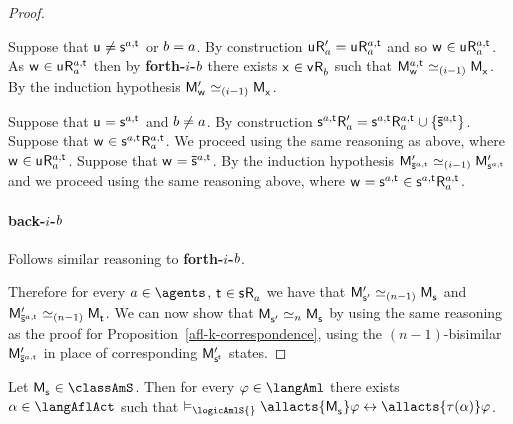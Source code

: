 \begin{proof}
\begin{enumerate}
        Suppose that $\aStateU \neq \aStateS[\agentA,\aStateT]$ or $b = a$.
        By construction $\aStateU \aAccessibilityP{\agentA} = \aStateU \aAccessibility[\agentA,\aStateT]{\agentA}$ and so $\aStateW \in \aStateU \aAccessibility[\agentA,\aStateT]{\agentA}$. 
        As $\aStateW \in \aStateU \aAccessibility[\agentA,\aStateT]{\agentA}$ then by {\bf forth-$i$-$b$} there exists $\aStateX \in \aStateV \aAccessibility{\agentB}$ such that $\aPModel[\agentA,\aStateT]{\aStateW} \bisimilar[(i - 1)] \aPModel{\aStateX}$.
        By the induction hypothesis $\aPModelP{\aStateW} \bisimilar[(i - 1)] \aPModel{\aStateX}$.

        Suppose that $\aStateU = \aStateS[\agentA,\aStateT]$ and $b \neq a$. 
        By construction $\aStateS[\agentA,\aStateT] \aAccessibilityP{\agentA} = \aStateS[\agentA,\aStateT] \aAccessibility[\agentA,\aStateT]{\agentA} \cup \{\aPStateS[\agentA,\aStateT]\}$. 
        Suppose that $\aStateW \in \aStateS[\agentA,\aStateT] \aAccessibility[\agentA,\aStateT]{\agentA}$. 
        We proceed using the same reasoning as above, where $\aStateW \in \aStateU \aAccessibility[\agentA,\aStateT]{\agentA}$. 
        Suppose that $\aStateW = \aPStateS[\agentA,\aStateT]$.
        By the induction hypothesis $\aPModelP{\aPStateS[\agentA,\aStateT]} \bisimilar[(i - 1)] \aPModelP{\aStateS[\agentA,\aStateT]}$ and we proceed using the same reasoning above, where $\aStateW = \aStateS[\agentA,\aStateT] \in \aStateS[\agentA,\aStateT] \aAccessibility[\agentA,\aStateT]{\agentA}$.

        \paragraph{back-$i$-$b$} Follows similar reasoning to {\bf forth-$i$-$b$}.
\end{enumerate}

Therefore for every $\agentA \in \agents$, $\aStateT \in \aStateS \aAccessibility{\agentA}$ we have that $\aPModelP{\aStateSP} \bisimilar[(n - 1)] \aPModel{\aStateS}$ and $\aPModelP{\aPStateS[\agentA,\aStateT]} \bisimilar[(n - 1)] \aPModel{\aStateT}$.
We can now show that $\aPModel{\aStateSP} \bisimilar[n] \aPModel{\aStateS}$ by using the same reasoning as the proof for Proposition~\ref{afl-k-correspondence}, using the $(n-1)$-bisimilar $\aPModelP{\aPStateS[\agentA,\aStateT]}$ in place of corresponding $\aPModelP{\aStateS[\aStateT]}$ states.
\end{proof}

\begin{corollary}
Let $\aPModel{\aStateS} \in \classAmS$.
Then for every $\phi \in \langAml$ there exists $\alpha \in \langAflAct$ such that $\entails_\logicAmlS{} \allacts{\aPModel{\aStateS}} \phi \iff \allacts{\tau(\alpha)} \phi$.
\end{corollary}

